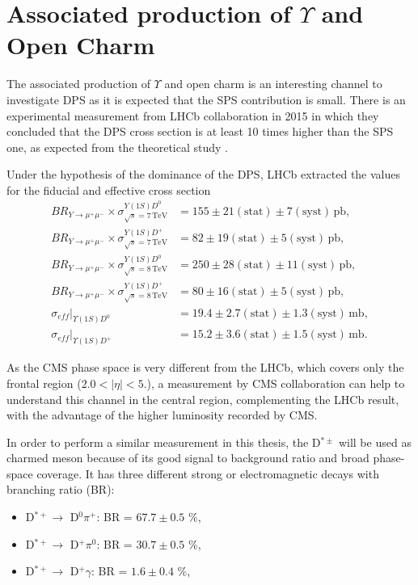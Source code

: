 \section{Associated production of \texorpdfstring{$\Upsilon$}{Y } and Open Charm} \label{sec:theoryY+D}

The associated production of $\Upsilon$ and open charm is an interesting channel to investigate DPS \cite{Lansberg:2019adr} as it is expected that the SPS contribution is small. There is an experimental measurement from LHCb collaboration in 2015 \cite{aaij2016production} in which they concluded that the DPS cross section is at least 10 times higher than the SPS one, as expected from the theoretical study \cite{Berezhnoy:2015jga}. 

Under the hypothesis of the dominance of the DPS, LHCb extracted the values for the fiducial and effective cross section
\begin{equation}
\begin{split}
    BR_{Y \rightarrow \mu^+\mu^-} \times \sigma^{Y(1S)D^0}_{\sqrt{s}=7\, \text{TeV}} &= 155 \pm 21 (\text{stat}) \pm 7(\text{syst}) \, \text{pb}, \\
    BR_{Y \rightarrow \mu^+\mu^-} \times \sigma^{Y(1S)D^+}_{\sqrt{s}=7\, \text{TeV}} &= 82 \pm 19 (\text{stat}) \pm 5(\text{syst}) \, \text{pb}, \\
    BR_{Y \rightarrow \mu^+\mu^-} \times \sigma^{Y(1S)D^0}_{\sqrt{s}=8\, \text{TeV}} &= 250 \pm 28 (\text{stat}) \pm 11(\text{syst}) \, \text{pb}, \\
    BR_{Y \rightarrow \mu^+\mu^-} \times \sigma^{Y(1S)D^+}_{\sqrt{s}=8\, \text{TeV}} &= 80 \pm 16 (\text{stat}) \pm 5(\text{syst}) \, \text{pb}, \\
    \sigma_{eff}|_{\Upsilon(1S)D^0} &= 19.4 \pm 2.7 (\text{stat}) \pm 1.3 (\text{syst}) \, \text{mb}, \\
    \sigma_{eff}|_{\Upsilon(1S)D^+} &= 15.2 \pm 3.6 (\text{stat}) \pm 1.5 (\text{syst}) \, \text{mb}. 
\end{split}
\end{equation}

As the CMS phase space is very different from the LHCb, which covers only the frontal region ($2.0 < |\eta| < 5.$), a measurement by CMS collaboration can help to understand this channel in the central region, complementing the LHCb result, with the advantage of the higher luminosity recorded by CMS.

In order to perform a similar measurement in this thesis, the D$^{*\pm}$ will be used as charmed meson because of its good signal to background ratio and broad phase-space coverage. It has three different strong or electromagnetic decays \cite{Workman:2022ynf} with branching ratio (BR):
\begin{itemize}
    \item D$^{*+} \rightarrow$ D$^0 \pi^+$: BR = $67.7 \pm 0.5$ \%,
    \item D$^{*+} \rightarrow$ D$^+ \pi^0$: BR = $30.7 \pm 0.5$ \%,
    \item D$^{*+} \rightarrow$ D$^+ \gamma$: BR = $1.6 \pm 0.4$ \%,
\end{itemize}

